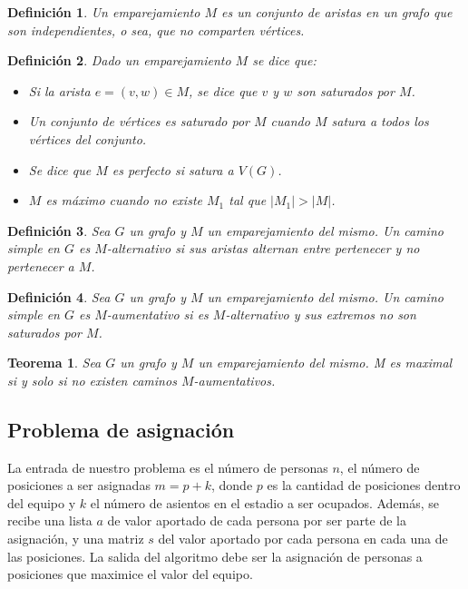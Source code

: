 \documentclass[10pt]{article} %
\newtheorem{thm}{Teorema}
\newtheorem{mydef}{Definici\'on}%
\begin{document}
	\begin{mydef}
		Un emparejamiento $ M $ es un conjunto de aristas en un grafo que son independientes, o sea, que no comparten v\'ertices.
	\end{mydef}

	\begin{mydef}
		Dado un emparejamiento $ M $ se dice que:
		\begin{itemize}
			\item Si la arista $ e = (v, w) \in M $, se dice que $ v $ y $ w $ son saturados por $ M $.
			\item Un conjunto de v\'ertices es saturado por $ M $ cuando $ M $ satura a todos los v\'ertices del conjunto.
			\item Se dice que $ M $ es perfecto si satura a $ V(G) $.
			\item $ M $ es m\'aximo cuando no existe $ M_{1} $ tal que $ |M_{1}| > |M| $.
		\end{itemize}
	\end{mydef}

	\begin{mydef}
		Sea $ G $ un grafo y $ M $ un emparejamiento del mismo. Un camino simple en $ G $ es $ M $-alternativo si sus aristas alternan entre pertenecer y no pertenecer a $ M $.
	\end{mydef}
	
	\begin{mydef}
		Sea $ G $ un grafo y $ M $ un emparejamiento del mismo. Un camino simple en $ G $ es $ M $-aumentativo si es $ M $-alternativo y sus extremos no son saturados por $ M $.
	\end{mydef}
	
	\begin{thm}
		Sea $ G $ un grafo y $ M $ un emparejamiento del mismo. M es maximal si y solo si no existen caminos $ M $-aumentativos.
	\end{thm}
	
	\subsection{Problema de asignaci\'on}
	
	La entrada de nuestro problema es el n\'umero de personas $ n $, el n\'umero de posiciones a ser asignadas $ m = p + k $, donde $ p $ es la cantidad de posiciones dentro del equipo y $ k $ el n\'umero de asientos en el estadio a ser ocupados. Adem\'as, se recibe una lista $ a $ de valor aportado de cada persona por ser parte de la asignaci\'on, y una matriz $ s $ del valor aportado por cada persona en cada una de las posiciones. La salida del algoritmo debe ser la asignaci\'on de personas a posiciones que maximice el valor del equipo.
	
\end{document}
